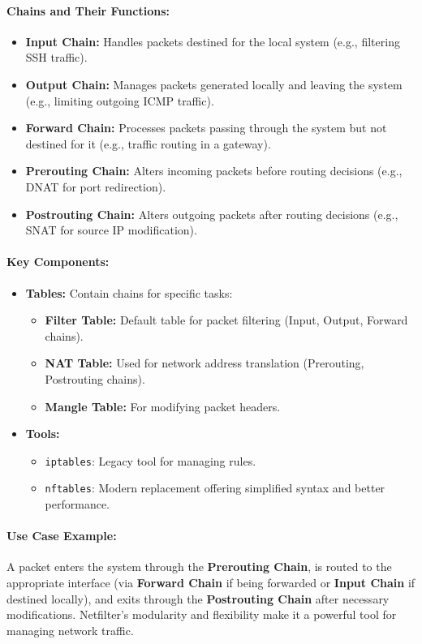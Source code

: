 \paragraph{Chains and Their Functions:}
\begin{itemize}
    \item \textbf{Input Chain:} Handles packets destined for the local system (e.g., filtering SSH traffic).
    \item \textbf{Output Chain:} Manages packets generated locally and leaving the system (e.g., limiting outgoing ICMP traffic).
    \item \textbf{Forward Chain:} Processes packets passing through the system but not destined for it (e.g., traffic routing in a gateway).
    \item \textbf{Prerouting Chain:} Alters incoming packets before routing decisions (e.g., DNAT for port redirection).
    \item \textbf{Postrouting Chain:} Alters outgoing packets after routing decisions (e.g., SNAT for source IP modification).
\end{itemize}
\paragraph{Key Components:}
\begin{itemize}
    \item \textbf{Tables:} Contain chains for specific tasks:
    \begin{itemize}
        \item \textbf{Filter Table:} Default table for packet filtering (Input, Output, Forward chains).
        \item \textbf{NAT Table:} Used for network address translation (Prerouting, Postrouting chains).
        \item \textbf{Mangle Table:} For modifying packet headers.
    \end{itemize}
    \item \textbf{Tools:}
    \begin{itemize}
        \item \texttt{iptables}: Legacy tool for managing rules.
        \item \texttt{nftables}: Modern replacement offering simplified syntax and better performance.
    \end{itemize}
\end{itemize}
\paragraph{Use Case Example:}
A packet enters the system through the \textbf{Prerouting Chain}, is routed to the appropriate interface (via \textbf{Forward Chain} if being forwarded or \textbf{Input Chain} if destined locally), and exits through the \textbf{Postrouting Chain} after necessary modifications.
Netfilter’s modularity and flexibility make it a powerful tool for managing network traffic.

